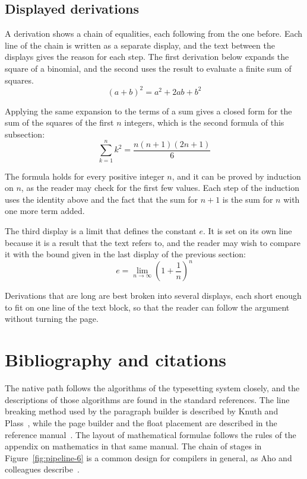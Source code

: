 \documentclass{article}
\begin{document}
\subsection{Displayed derivations}\label{sec:derivations-6}

A derivation shows a chain of equalities, each following from the one before. Each line
of the chain is written as a separate display, and the text between the displays gives
the reason for each step. The first derivation below expands the square of a binomial,
and the second uses the result to evaluate a finite sum of squares.
\[
  (a+b)^{2} = a^{2} + 2ab + b^{2}
\]

Applying the same expansion to the terms of a sum gives a closed form for the sum of the
squares of the first $n$ integers, which is the second formula of this subsection:
\[
  \sum_{k=1}^{n} k^{2} = \frac{n(n+1)(2n+1)}{6}
\]

The formula holds for every positive integer $n$, and it can be proved by induction on
$n$, as the reader may check for the first few values. Each step of the induction
uses the identity above and the fact that the sum for $n+1$ is the sum for $n$ with one
more term added.

The third display is a limit that defines the constant $e$. It is set on its own line
because it is a result that the text refers to, and the reader may wish to compare it
with the bound given in the last display of the previous section:
\[
  e = \lim_{n\to\infty} \left( 1 + \frac{1}{n} \right)^{n}
\]

Derivations that are long are best broken into several displays, each short enough to
fit on one line of the text block, so that the reader can follow the argument without
turning the page.

\section{Bibliography and citations}\label{sec:refs-6}

The native path follows the algorithms of the typesetting system closely, and the
descriptions of those algorithms are found in the standard references. The line
breaking method used by the paragraph builder is described by Knuth and
Plass~\cite{knuth81-6}, while the page builder and the float placement are described in
the reference manual~\cite{knuth86-6}. The layout of mathematical formulae follows the
rules of the appendix on mathematics in that same manual. The chain of stages in
Figure~\ref{fig:pipeline-6} is a common design for compilers in general, as Aho and
colleagues describe~\cite{aho06-6}.
\end{document}
